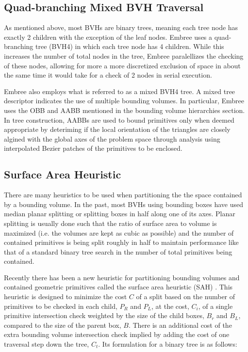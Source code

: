 \documentclass{anstrans}
\begin{document}
\subsection{Quad-branching Mixed BVH Traversal}

As mentioned above, most BVHs are binary trees, meaning each tree node has exactly 2 children with the exception of the leaf nodes. Embree uses a quad-branching tree (BVH4) in which each tree node has 4 children. While this increases the number of total nodes in the tree, Embree paralellizes the checking of these nodes, allowing for more a more discretized exclusion of space in about the same time it would take for a check of 2 nodes in serial execution. 

Embree also employs what is referred to as a mixed BVH4 tree. A mixed tree descriptor indicates the use of multiple bounding volumes. In particular, Embree uses the OBB and AABB mentioned in the bounding volume hierarchies section. In tree construction, AABBs are used to bound primitives only when deemed appropriate by deteriming if the local orientation of the triangles are closely algined with the global axes of the problem space through analysis using interpolated Bezier patches of the primitives to be enclosed. 

\subsection{Surface Area Heuristic}

There are many heuristics to be used when partitioning the the space contained by a bounding volume. In the past, most BVHs using bounding boxes have used median planar splitting or splitting boxes in half along one of its axes. Planar splitting is usually done such that the ratio of surface area to volume is maximized (i.e. the volumes are kept as cubic as possible) and the number of contained primitives is being split roughly in half to maintain performance like that of a standard binary tree search in the number of total primitives being contained. 

Recently there has been a new heuristic for partitioning bounding volumes and contained geometric primitives called the surface area heuristic (SAH) \cite{sah}. This heuristic is designed to minimize the cost $C$ of a split based on the number of primitives to be checked in each child, $P_{R}$ and $P_{L}$, at the cost, $C_{i}$, of a single primitive intersection check weighted by the size of the child boxes, $B_{r}$ and $B_{L}$, compared to the size of the parent box, $B$. There is an additional cost of the extra bounding volume intersection check implied by adding the cost of one traversal step down the tree, $C_{t}$.
Its formulation for a binary tree is as follows: 
\end{document}
